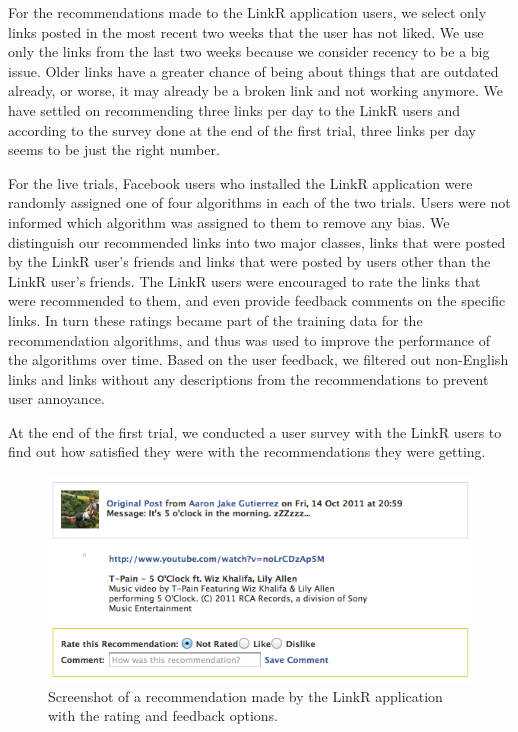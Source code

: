 For the recommendations made to the LinkR application users,  we select only links posted in the most recent two weeks that the user has not liked. We use only the links from the last two weeks because we consider recency to be a big issue. Older links have a greater chance of being about things that are outdated already, or worse, it may already be a broken link and not working anymore. We have settled on recommending three links per day to the LinkR users and according to the survey done at the end of the first trial, three links per day seems to be just the right number.

For the live trials, Facebook users who installed the LinkR application were randomly assigned one of four algorithms in each of the two trials. Users were not informed which algorithm was assigned to them to remove any bias. We distinguish our recommended links into two major classes, links that were posted by the LinkR user's friends and links that were posted by users other than the LinkR user's friends. The LinkR users were encouraged to rate the links that were recommended to them, and even provide feedback comments on the specific links. In turn these ratings became part of the training data for the recommendation algorithms, and thus was used to improve the performance of the algorithms over time. Based on the user feedback, we filtered out non-English links and links without any descriptions from the recommendations to prevent user annoyance.

At the end of the first trial, we conducted a user survey with the LinkR users to find out how satisfied they were with the recommendations they were getting.

\begin{figure}
\centering
\includegraphics[scale=0.5]{img/linkr_rating.png}
\caption{Screenshot of a recommendation made by the LinkR application with the rating and feedback options.}
 \end{figure}
 
